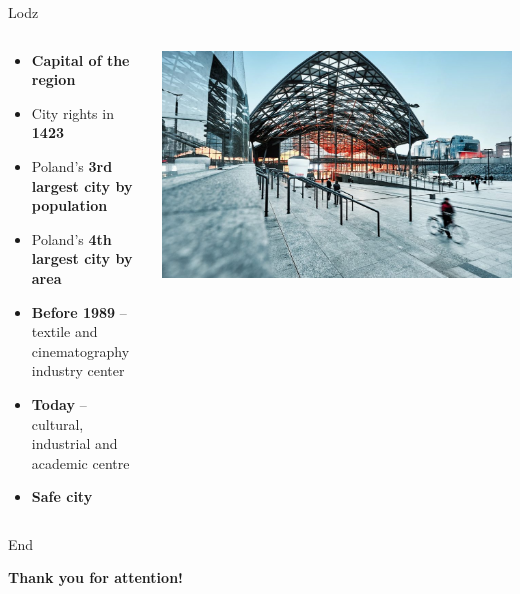 \documentclass[hyperref={pdfpagemode=FullScreen}]{beamer}
\begin{document}
\begin{frame}{Lodz}
\begin{columns}

\begin{column}{.5\textwidth}
\begin{itemize}
    \item\footnotesize\textbf{Capital of the region}
    \item\footnotesize{City rights in \textbf{1423}}
    \item\footnotesize{Poland’s \textbf{3rd largest city by population}}
    \item\footnotesize{Poland’s \textbf{4th largest city by area}}
    \item\footnotesize{\textbf{Before 1989} – textile and cinematography industry center}
    \item\footnotesize{\textbf{Today} – cultural, industrial and academic centre}
    \item\footnotesize\textbf{Safe city}
\end{itemize}
\end{column}

\begin{column}{.5\textwidth}
\includegraphics[scale=.21]{img/pic4.jpg}
\end{column}
\end{columns}
\end{frame}


\begin{frame}{End}
\begin{center}
\Huge\textbf{Thank you for attention!}
\end{center}
\end{frame}
\end{document}
